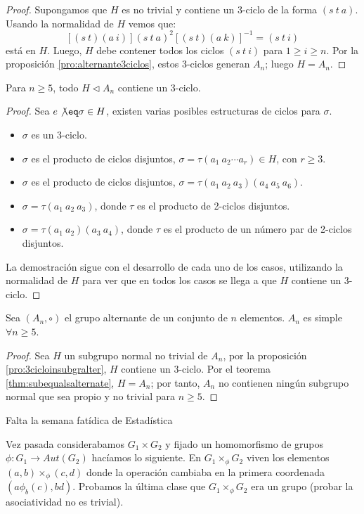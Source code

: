 \begin{proof}
	Supongamos que $H$ es no trivial y contiene un 3-ciclo de la forma $(s\ t\ a)$. Usando la normalidad de $H$ vemos que:
	\[
		[(s\ t)(a\ i)](s\ t\ a)^2[(s\ t)(a\ k)]^{-1} = (s\ t\ i)
	\]
	está en $H$. Luego, $H$ debe contener todos los ciclos $(s\ t\ i)$ para $1 \geq i \geq n$. Por la proposición \ref{pro:alternante3ciclos}, estos 3-ciclos generan $A_n$; luego $H = A_n$.
\end{proof}
\begin{pro}
	\label{pro:3cicloinsubgralter}
	Para $n\geq 5$, todo $H \triangleleft A_n$ contiene un 3-ciclo.
\end{pro}
\begin{proof}
	Sea $e \not \eq \sigma \in H$, existen varias posibles estructuras de ciclos para $\sigma$.
	\begin{itemize}
		\item $\sigma$ es un 3-ciclo.
		\item $\sigma$ es el producto de ciclos disjuntos, $\sigma = \tau(a_1\ a_2 \cdots a_r)\in H$, con $r\geq 3$.
		\item $\sigma$ es el producto de ciclos disjuntos, $\sigma = \tau(a_1\ a_2\ a_3)(a_4\ a_5\ a_6)$.
		\item $\sigma = \tau(a_1\ a_2\ a_3)$, donde $\tau$ es el producto de 2-ciclos disjuntos.
		\item $\sigma = \tau(a_1\ a_2)(a_3\ a_4)$, donde $\tau$ es el producto de un número par de 2-ciclos disjuntos.
	\end{itemize}
	La demostración sigue con el desarrollo de cada uno de los casos, utilizando la normalidad de $H$ para ver que en todos los casos se llega a que $H$ contiene un 3-ciclo.
\end{proof}
\begin{thm}
	Sea $(A_n, \circ)$ el grupo alternante de un conjunto de $n$ elementos. $A_n$ es simple $\forall n \geq 5$.
\end{thm}
\begin{proof}
	Sea $H$ un subgrupo normal no trivial de $A_n$, por la proposición \ref{pro:3cicloinsubgralter}, $H$ contiene un 3-ciclo. Por el teorema \ref{thm:subequalsalternate}, $H = A_n$; por tanto, $A_n$ no contienen ningún subgrupo normal que sea propio y no trivial para $n\geq 5$.
\end{proof}
Falta la semana fatídica de Estadística

Vez pasada considerabamos $G_1 \times G_2$ y fijado un homomorfismo de grupos $\phi: G_1 \to Aut(G_2)$ hacíamos lo siguiente. En $G_1 \times_{\phi} G_2$ viven los elementos $(a,b) \times_{\phi} (c,d)$ donde la operación cambiaba en la primera coordenada $(a \phi_b(c), bd)$. Probamos la última clase que $G_1 \times_{\phi} G_2$ era un grupo (probar la asociatividad no es trivial).

